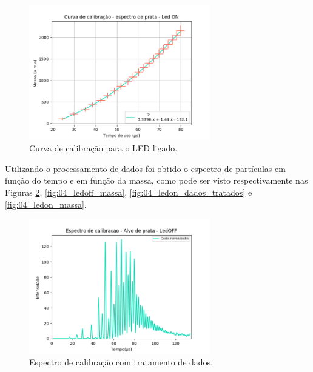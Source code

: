 \begin{figure}
  \centering  
  \includegraphics[width=0.7\textwidth]{exp_04/LEDON_curv+erro_calib.png}
  \caption{Curva de calibração para o LED ligado.}
  \label{fig:04_calib_ledON} 
\end{figure}



Utilizando o processamento de dados foi obtido o espectro de partículas em função do tempo e em função da massa, como pode ser visto respectivamente nas Figuras \ref{fig:04_ledoff_dados_tratados}, \ref{fig:04_ledoff_massa}, \ref{fig:04_ledon_dados_tratados} e \ref{fig:04_ledon_massa}.

\begin{figure}
  \centering  
  \includegraphics[width=0.7\textwidth]{exp_04/LEDOFF_normalizado_mcp.png}
  \caption{Espectro de calibração com tratamento de dados.}
  \label{fig:04_ledoff_dados_tratados} 
\end{figure}

